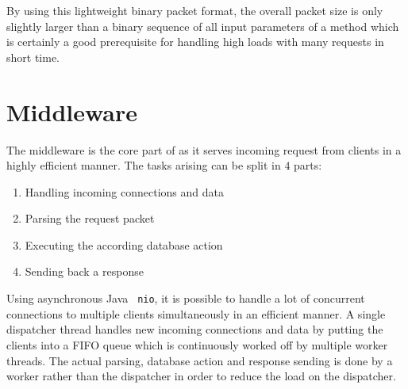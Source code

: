 \documentclass[a4paper, oneside]{csthesis}
\begin{document}
\begin{table}[hp]
        \caption{Supported packets in \telesto. By convention an odd {\tt
        method\_id} indicates client to server communication while even values
        are server to client communication. Queue and Message objects in the
        payload include all fields stored in the database (see \cref{sec:db}).
        The {\tt mode} in the ReadMessage packet is used to indicate whether
        the oldest message or the one with the highest priority should be
        served.}
        \label{tbl:packets}
    \end{table}
    
    By using this lightweight binary packet format, the overall packet size is
    only slightly larger than a binary sequence of all input parameters of a
    method which is certainly a good prerequisite for handling high loads with
    many requests in short time. 


\section{Middleware}

    The middleware is the core part of \telesto{} as it serves incoming request
    from clients in a highly efficient manner. The tasks arising can be split in
    $4$ parts:
    
    \begin{enumerate}
        \item Handling incoming connections and data
        \item Parsing the request packet
        \item Executing the according database action
        \item Sending back a response
    \end{enumerate}

    Using asynchronous Java {\tt
    nio}, it is possible to handle a lot of concurrent connections to
    multiple clients simultaneously in an efficient manner. A single
    dispatcher thread handles new incoming connections and data by putting
    the clients into a FIFO queue which is continuously worked off by multiple
    worker threads. The actual parsing, database action and response sending is done by
    a worker rather than the dispatcher in order to reduce the load on the
    dispatcher.
    
\end{document}
